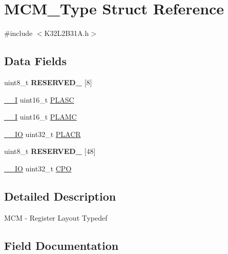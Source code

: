 \hypertarget{struct_m_c_m___type}{}\section{M\+C\+M\+\_\+\+Type Struct Reference}
\label{struct_m_c_m___type}


{\ttfamily \#include $<$K32\+L2\+B31\+A.\+h$>$}

\subsection*{Data Fields}
\begin{DoxyCompactItemize}
\item 
\mbox{\label{struct_m_c_m___type_ab5b3e978eb3ceb8a2aadaeeab28db00b}} 
uint8\+\_\+t {\bfseries R\+E\+S\+E\+R\+V\+E\+D\+\_} \mbox{[}8\mbox{]}
\item 
\mbox{\hyperlink{core__cm0plus_8h_af63697ed9952cc71e1225efe205f6cd3}{\+\_\+\+\_\+I}} uint16\+\_\+t \mbox{\hyperlink{struct_m_c_m___type_a59d6723930c0cbfd56a7451ec569b598}{P\+L\+A\+SC}}
\item 
\mbox{\hyperlink{core__cm0plus_8h_af63697ed9952cc71e1225efe205f6cd3}{\+\_\+\+\_\+I}} uint16\+\_\+t \mbox{\hyperlink{struct_m_c_m___type_a951da47dda3dfe3452e96e494178fad4}{P\+L\+A\+MC}}
\item 
\mbox{\hyperlink{core__cm0plus_8h_aec43007d9998a0a0e01faede4133d6be}{\+\_\+\+\_\+\+IO}} uint32\+\_\+t \mbox{\hyperlink{struct_m_c_m___type_a16512ce9ebeba1cd4b36259b4872b679}{P\+L\+A\+CR}}
\item 
\mbox{\label{struct_m_c_m___type_ad8a834e9c0be4b8a1f57679868c10f2d}} 
uint8\+\_\+t {\bfseries R\+E\+S\+E\+R\+V\+E\+D\+\_} \mbox{[}48\mbox{]}
\item 
\mbox{\hyperlink{core__cm0plus_8h_aec43007d9998a0a0e01faede4133d6be}{\+\_\+\+\_\+\+IO}} uint32\+\_\+t \mbox{\hyperlink{struct_m_c_m___type_ab20545f6570ba4fbd88b12f2f32d6cc4}{C\+PO}}
\end{DoxyCompactItemize}


\subsection{Detailed Description}
M\+CM -\/ Register Layout Typedef 

\subsection{Field Documentation}
\mbox{\label{struct_m_c_m___type_ab20545f6570ba4fbd88b12f2f32d6cc4}} 

